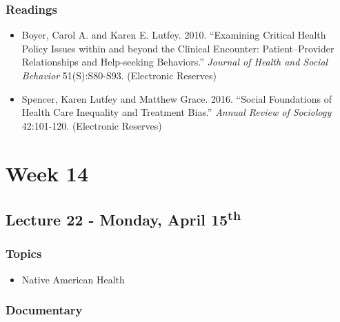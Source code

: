 \documentclass[]{book}
\providecommand{\tightlist}{%
  \setlength{\itemsep}{0pt}\setlength{\parskip}{0pt}}
\begin{document}
\hypertarget{readings-22}{%
\subsubsection*{Readings}\label{readings-22}}

\begin{itemize}
\tightlist
\item
  Boyer, Carol A. and Karen E. Lutfey. 2010. ``Examining Critical Health Policy Issues within and beyond the Clinical Encounter: Patient--Provider Relationships and Help-seeking Behaviors.'' \emph{Journal of Health and Social Behavior} 51(S):S80-S93. (Electronic Reserves)
\item
  Spencer, Karen Lutfey and Matthew Grace. 2016. ``Social Foundations of Health Care Inequality and Treatment Bias.'' \emph{Annual Review of Sociology} 42:101-120. (Electronic Reserves)
\end{itemize}

\hypertarget{week-14}{%
\section*{Week 14}\label{week-14}}

\hypertarget{lecture-22---monday-april-15th}{%
\subsection*{\texorpdfstring{Lecture 22 - Monday, April 15\textsuperscript{th}}{Lecture 22 - Monday, April 15th}}\label{lecture-22---monday-april-15th}}

\hypertarget{topics-25}{%
\subsubsection*{Topics}\label{topics-25}}

\begin{itemize}
\tightlist
\item
  Native American Health
\end{itemize}

\hypertarget{documentary-2}{%
\subsubsection*{Documentary}\label{documentary-2}}
\end{document}
